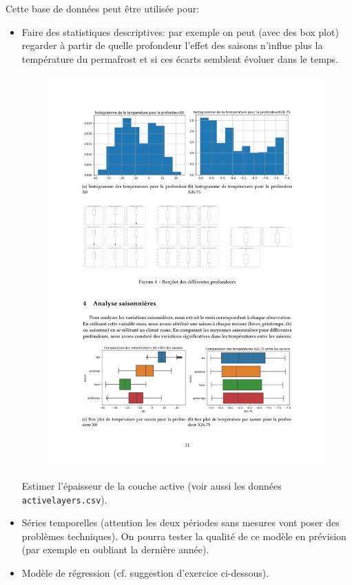 \documentclass[a4paper,12pt]{article}
\theoremstyle{exercice}
\begin{document}
Cette base de données peut être utilisée pour:
\begin{itemize}
\item Faire des statistiques descriptives: par exemple on peut (avec des box plot) regarder à partir de quelle profondeur l'effet des saisons n'influe plus la température du permafrost et si ces écarts semblent évoluer dans le temps.

\begin{figure}[h!]\begin{center}
\includegraphics[scale=.8]{Saison.pdf}\end{center}

\end{figure} Estimer l'épaisseur de la couche active (voir aussi les données \texttt{activelayers.csv}).
\item
Séries temporelles (attention les deux périodes sans mesures vont poser des problèmes techniques). On pourra tester la qualité de ce modèle en prévision (par exemple en oubliant la dernière année).
\item
Modèle de régression (cf. suggestion d'exercice ci-dessous).
\end{itemize}
\end{document}
